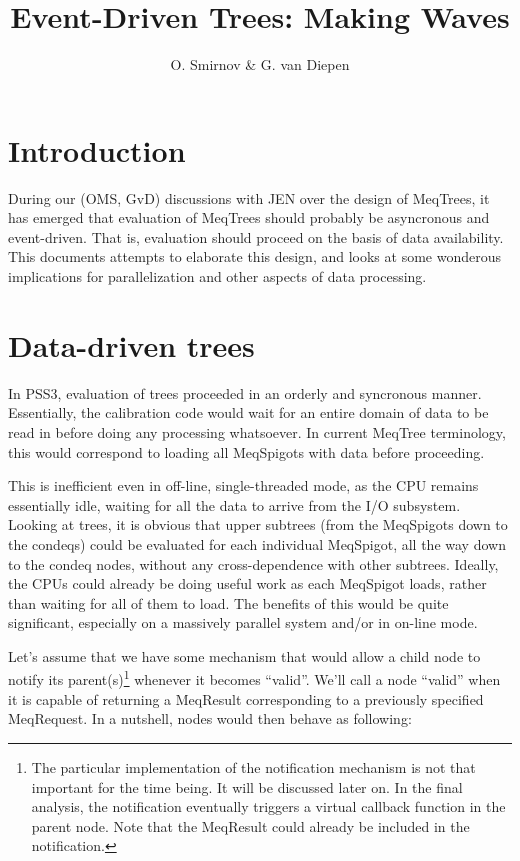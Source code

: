 \documentclass[12pt]{article}
\title{Event-Driven Trees: Making Waves}
\author{O. Smirnov \& G. van Diepen}
\begin{document}
\sloppy

\newcommand{\url}[1]{{\tt #1}}

\maketitle


\section{Introduction}
  
  During our (OMS, GvD) discussions with JEN over the design of MeqTrees, it
  has emerged that evaluation of MeqTrees should probably be asyncronous and
  event-driven. That is, evaluation should proceed on the basis of data
  availability. This documents attempts to elaborate this design, and looks at
  some wonderous implications for parallelization and other aspects of data
  processing. 

\section{Data-driven trees}

  In PSS3, evaluation of trees proceeded in an orderly and syncronous manner.
  Essentially, the calibration code would wait for an entire domain of data to
  be read in before doing any processing whatsoever. In current MeqTree
  terminology, this would correspond to loading all MeqSpigots with data before
  proceeding. 

  This is inefficient even in off-line, single-threaded mode, as the CPU
  remains essentially idle, waiting for all the data to arrive from the I/O
  subsystem. Looking at trees, it is obvious that upper subtrees (from the
  MeqSpigots down to the condeqs) could be evaluated for each individual
  MeqSpigot, all the way down to the condeq nodes, without any cross-dependence
  with other subtrees. Ideally, the CPUs could already be doing useful work as
  each MeqSpigot loads, rather than waiting for all of them to load. The
  benefits of this would be quite significant, especially on a massively
  parallel system and/or in on-line mode.

  Let's assume that we have some mechanism that would allow a child node to
  notify its parent(s)\footnote{The particular implementation of the
  notification mechanism is not that important for the time being. It will be
  discussed later on. In the final analysis, the notification eventually
  triggers a virtual callback function in the parent node. Note that the
  MeqResult could already be included in the notification.} whenever it becomes
  ``valid''. We'll call a node ``valid'' when it is capable of returning a
  MeqResult corresponding to a previously specified MeqRequest. In a nutshell,
  nodes would then behave as following:
\end{document}
